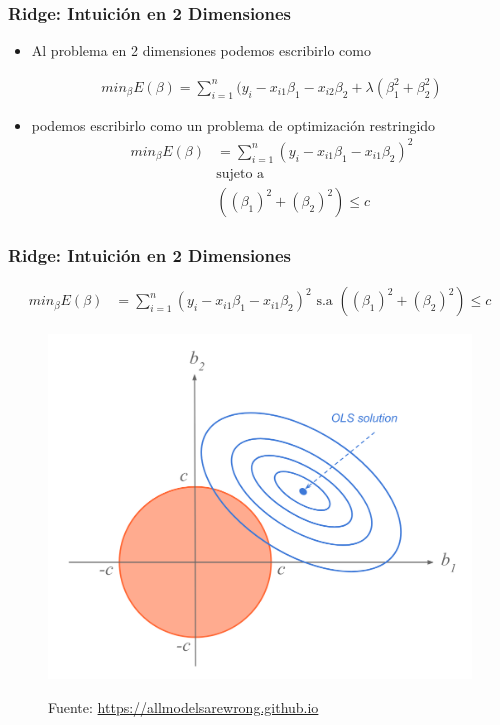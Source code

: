 \documentclass[
  shownotes,
  xcolor={svgnames},
  hyperref={colorlinks,citecolor=DarkBlue,linkcolor=andesred,urlcolor=DarkBlue}
  , aspectratio=169]{beamer}
\begin{document}
\begin{frame}[fragile]
\frametitle{Ridge: Intuición en 2 Dimensiones }

\begin{itemize}
\item Al problema en 2 dimensiones podemos escribirlo como

  \begin{align}
  min_{\beta} E(\beta) = \sum_{i=1}^n (y_i  - x_{i1}\beta_1  - x_{i2}\beta_2 + \lambda  \left(\beta_1^2 + \beta_2^2 \right)
  \end{align}
\medskip 
\item podemos escribirlo como un problema de optimización restringido
  \begin{align}
     min_{\beta} E(\beta) &= \sum_{i=1}^n (y_i - x_{i1}\beta_1 - x_{i1}\beta_2)^2  \\ \nonumber
     & \text{sujeto a}   \\
     & \left( (\beta_1)^2 + (\beta_2)^2 \right) \leq c \nonumber
  \end{align}

\end{itemize}

\end{frame}
\begin{frame}[fragile]
\frametitle{Ridge: Intuición en 2 Dimensiones }

\begin{align}
     min_{\beta} E(\beta) &= \sum_{i=1}^n (y_i - x_{i1}\beta_1 - x_{i1}\beta_2)^2  \text{ s.a }   \left( (\beta_1)^2 + (\beta_2)^2 \right) \leq c 
  \end{align}

\begin{figure}[H] \centering
            \captionsetup{justification=centering}
              \includegraphics[scale=0.3]{figures/ridge1}
 
\tiny
Fuente: \url{https://allmodelsarewrong.github.io}
\end{figure}


\end{frame}
\end{document}
